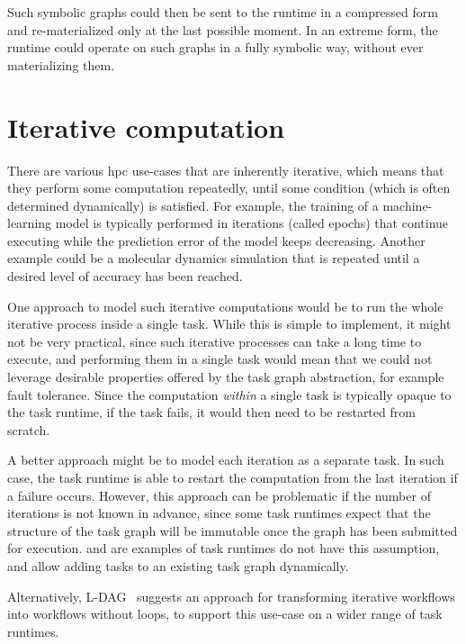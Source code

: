 \begin{description}[wide=0pt]
		Such symbolic graphs could then be sent to the runtime in a compressed form and re-materialized
		only at the last possible moment. In an extreme form, the runtime could operate on such graphs in a
		fully symbolic way, without ever materializing them.
\end{description}

\section{Iterative computation}
There are various \gls{hpc} use-cases that are inherently iterative, which means
that they perform some computation repeatedly, until some condition (which is often determined
dynamically) is satisfied. For example, the training of a machine-learning model is typically
performed in iterations (called epochs) that continue executing while the prediction error of the
model keeps decreasing. Another example could be a molecular dynamics simulation that is repeated
until a desired level of accuracy has been reached.

One approach to model such iterative computations would be to run the whole iterative process
inside a single task. While this is simple to implement, it might not be very practical, since such
iterative processes can take a long time to execute, and performing them in a single task would
mean that we could not leverage desirable properties offered by the task graph abstraction, for
example fault tolerance. Since the computation \emph{within} a single task is
typically opaque to the task runtime, if the task fails, it would then need to be restarted from
scratch.

A better approach might be to model each iteration as a separate task. In such case, the task
runtime is able to restart the computation from the last iteration if a failure occurs. However,
this approach can be problematic if the number of iterations is not known in advance, since some
task runtimes expect that the structure of the task graph will be immutable once the graph has been
submitted for execution. \dask{} and \ray{} are examples of task runtimes do not have this
assumption, and allow adding tasks to an existing task graph dynamically.

Alternatively, \textsc{L-DAG}~\cite{l-dag} suggests an approach for transforming iterative
workflows into workflows without loops, to support this use-case on a wider range of task runtimes.

